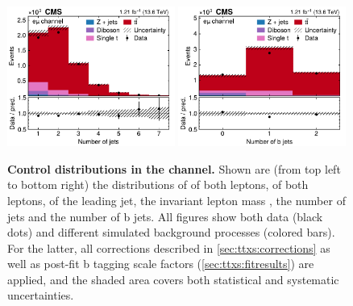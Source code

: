 \begin{figure}[!hp]
\includegraphics[width=0.49\textwidth]{figures/ttxs/njet_em.pdf}
\hfill
\includegraphics[width=0.49\textwidth]{figures/ttxs/nbtag_em.pdf}
\caption{
    \textbf{Control distributions in the \emu channel.} Shown are (from top left to bottom right) the distributions of \pt of both leptons, \abseta of both leptons, \pt of the leading jet, the invariant lepton mass \mll, the number of jets and the number of b jets. All figures show both data (black dots) and different simulated background processes (colored bars). For the latter, all corrections described in \cref{sec:ttxs:corrections} as well as post-fit b tagging scale factors (\cref{sec:ttxs:fitresults}) are applied, and the shaded area covers both statistical and systematic uncertainties. 
}
\label{fig:ttxs:control_em}
\end{figure}

